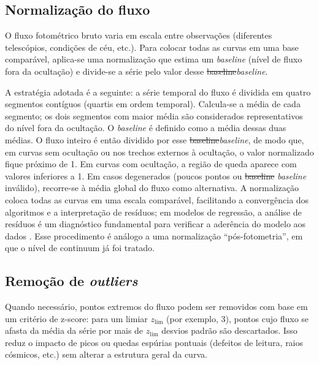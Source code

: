 \documentclass[msc]{on} %
\makeatletter
\providecommand{\DIFaddtex}[1]{{\protect\color{red}#1}} %
\providecommand{\DIFdeltex}[1]{{\protect\color{red}\sout{#1}}} %
\providecommand{\DIFaddbegin}{} %
\providecommand{\DIFaddend}{} %
\providecommand{\DIFdelbegin}{} %
\providecommand{\DIFdelend}{} %
\providecommand{\DIFadd}[1]{\texorpdfstring{\DIFaddtex{#1}}{#1}} %
\providecommand{\DIFdel}[1]{\texorpdfstring{\DIFdeltex{#1}}{}} %
\let\sout@orig\sout %
\renewcommand{\sout}[1]{\ifmmode\text{\sout@orig{\ensuremath{#1}}}\else\sout@orig{#1}\fi} %
\makeatother
\begin{document}
\subsection{Normalização do fluxo}

O fluxo fotométrico bruto varia em escala entre observações (diferentes telescópios, condições de céu, etc.). Para colocar todas as curvas em uma base comparável, aplica-se uma normalização que estima um \textit{baseline} (nível de fluxo fora da ocultação) e divide-se a série pelo valor desse \DIFdelbegin \DIFdel{baseline}\DIFdelend \DIFaddbegin \textit{\DIFadd{baseline}}\DIFaddend .

A estratégia adotada é a seguinte: a série temporal do fluxo é dividida em quatro segmentos contíguos (quartis em ordem temporal). Calcula-se a média de cada segmento; os dois segmentos com maior média são considerados representativos do nível fora da ocultação. O \textit{baseline} é definido como a média dessas duas médias. O fluxo inteiro é então dividido por esse \DIFdelbegin \DIFdel{baseline}\DIFdelend \DIFaddbegin \textit{\DIFadd{baseline}}\DIFaddend , de modo que, em curvas sem ocultação ou nos trechos externos à ocultação, o valor normalizado fique próximo de 1. Em curvas com ocultação, a região de queda aparece com valores inferiores a 1. Em casos degenerados (poucos pontos ou \DIFdelbegin \DIFdel{baseline }\DIFdelend \DIFaddbegin \textit{\DIFadd{baseline}} \DIFaddend inválido), recorre-se à média global do fluxo como alternativa. A normalização coloca todas as curvas em uma escala comparável, facilitando a convergência dos algoritmos e a interpretação de resíduos; em modelos de regressão, a análise de resíduos é um diagnóstico fundamental para verificar a aderência do modelo aos dados \citep{Morettin2010}. Esse procedimento é análogo a uma normalização ``pós-fotometria'', em que o nível de continuum já foi tratado.

\subsection{Remoção de \textit{outliers}}

Quando necessário, pontos extremos do fluxo podem ser removidos com base em um critério de z-score: para um limiar \(z_{\mathrm{lim}}\) (por exemplo, 3), pontos cujo fluxo se afasta da média da série por mais de \(z_{\mathrm{lim}}\) desvios padrão são descartados. Isso reduz o impacto de picos ou quedas espúrias pontuais (defeitos de leitura, raios cósmicos, etc.) sem alterar a estrutura geral da curva.
\end{document}
